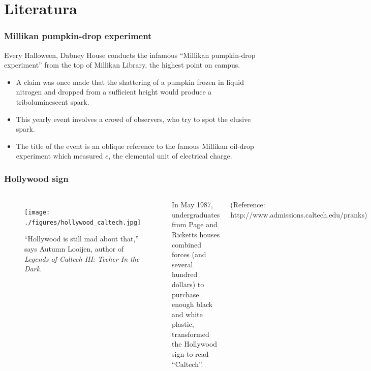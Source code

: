 \documentclass[hyperref={bookmarks=false},aspectratio=169]{beamer}
\begin{document}
\section{Literatura}

\begin{frame}
\frametitle{Millikan pumpkin-drop experiment}
Every Halloween, Dabney House conducts the infamous ``Millikan pumpkin-drop experiment'' from the top of Millikan Library, the highest point on campus.

\begin{itemize}
    \item A claim was once made that the shattering of a pumpkin frozen in liquid nitrogen and dropped from a sufficient height would produce a triboluminescent spark. 
    \item This yearly event involves a crowd of observers, who try to spot the elusive spark.
    \item The title of the event is an oblique reference to the famous Millikan oil-drop experiment which measured $e$, the elemental unit of electrical charge.
\end{itemize}

\end{frame}

\begin{frame}
\frametitle{Hollywood sign}

\begin{columns}


\begin{figure}
    \centering
    \texttt{[image: ./figures/hollywood\_caltech.jpg]}
    \caption{``Hollywood is still mad about that,'' says Autumn Looijen, author of \emph{Legends of Caltech III: Techer In the Dark.} }
    \label{fig:hollywood_prank}
\end{figure}


In May 1987, undergraduates from Page and Ricketts houses combined forces (and several hundred dollars) to purchase enough black and white plastic, transformed the Hollywood sign to read ``Caltech''.

\small{(Reference: http://www.admissions.caltech.edu/pranks)}

\end{columns}
\end{frame}
\end{document}
